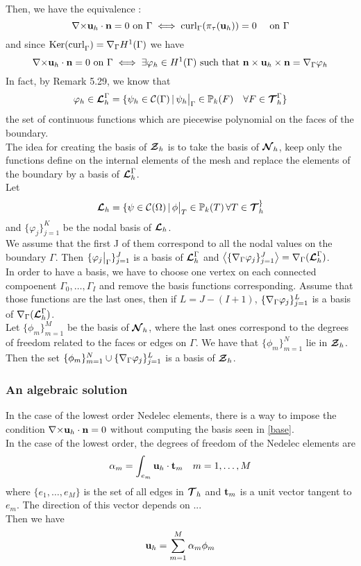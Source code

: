 Then, we have the equivalence :
\[ {\nabla\times}{\mathbf{u}}_h\cdot{\mathbf{n}}=0\mbox{ on }\Gamma \iff
\mathrm{curl}_\Gamma(\pi_\tau({\mathbf{u}}_h))=0\quad \mbox{ on } \Gamma \]
and since $\mathrm{Ker(curl}_\Gamma)={\nabla}_\Gamma H^1(\Gamma)$ we have 
\[ {\nabla\times}{\mathbf{u}}_h\cdot{\mathbf{n}}=0\mbox{ on }\Gamma \iff
\exists\varphi_h\in H^1(\Gamma) \mbox{ such that
}{\mathbf{n}}\times{\mathbf{u}}_h\times{\mathbf{n}} = {\nabla}_\Gamma\varphi_h \]
In fact, by \cite{Monk2003} Remark 5.29, we know that 
\[\varphi_h\in{\bm{\mathcal{L}}}_h^\Gamma = \{\psi_h\in\mathcal{C}(\Gamma) \,|\,
\psi_h{\big\rvert_{\Gamma}}\in{\mathbb{P}}_k(F) \quad \forall F\in{\bm{\mathcal{T}}}_h^\Gamma \}\]
the set of continuous functions which are piecewise polynomial on the faces of
the boundary.\\

The idea for creating the basis of ${\bm{\mathcal{Z}}}_h$ is to take the basis of ${\bm{\mathcal{N}}}_h$, keep
only the functions define on the internal elements of the mesh and replace the
elements of the boundary by a basis of ${\bm{\mathcal{L}}}_h^\Gamma$.\\

Let \[ {\bm{\mathcal{L}}}_h=\{\psi\in\mathcal{C}(\Omega) \,|\,
\phi{\big\rvert_{T}}\in{\mathbb{P}}_k(T)\,\forall T\in{\bm{\mathcal{T}}}_h^\} \]
and $\{\varphi_j\}_{j=1}^K$ be the nodal basis of ${\bm{\mathcal{L}}}_h$.\\
We assume that the first J of them correspond to all the nodal values on the
boundary $\Gamma$. Then $\{\varphi_j{\big\rvert_{\Gamma}}\}_{j=1}^J$ is a
basis of ${\bm{\mathcal{L}}}_h^\Gamma$ and
$\left\langle\{{\nabla}_\Gamma\varphi_j\}_{j=1}^J\right\rangle={\nabla}_\Gamma({\bm{\mathcal{L}}}_h^\Gamma)$.\\
In order to have a basis, we have to choose one vertex on each connected
compoenent $\Gamma_0,\dots,\Gamma_I$ and remove the basis functions
corresponding. Assume that those functions are the last ones, then if
$L=J-(I+1)$, $\{{\nabla}_\Gamma\varphi_j\}_{j=1}^L$ is a basis of
${\nabla}_\Gamma({\bm{\mathcal{L}}}_h^\Gamma)$.\\
Let $\{\phi_m\}_{m=1}^M$ be the basis of ${\bm{\mathcal{N}}}_h$, where the last ones
correspond to the degrees of freedom related to the faces or edges on
$\Gamma$. We have that $\{\phi_m\}_{m=1}^N$ lie in ${\bm{\mathcal{Z}}}_h$.\\

Then the set $\{\phi_m\}_{m=1}^N\cup  \{{\nabla}_\Gamma\varphi_j\}_{j=1}^L$
is a basis of ${\bm{\mathcal{Z}}}_h$.

\subsubsection{An algebraic solution}
In the case of the lowest order Nedelec elements, there is a way to impose the
condition ${\nabla\times}{\mathbf{u}}_h\cdot{\mathbf{n}}=0$ without computing the basis seen in
  \ref{base}.\\
In the case of the lowest order, the degrees of freedom of the Nedelec elements
are \[\alpha_m=\int_{e_m} {\mathbf{u}}_h\cdot{\mathbf{t}}_m \quad m=1,\dots,M\] where $\{e_1,\dots,e_M\}$ is the set
of all edges in ${\bm{\mathcal{T}}}_h$ and ${\mathbf{t}}_m$ is a unit vector tangent to $e_m$. The
direction of this vector depends on ...\\
Then we have \[{\mathbf{u}}_h = \sum_{m=1}^M \alpha_m\phi_m\]

